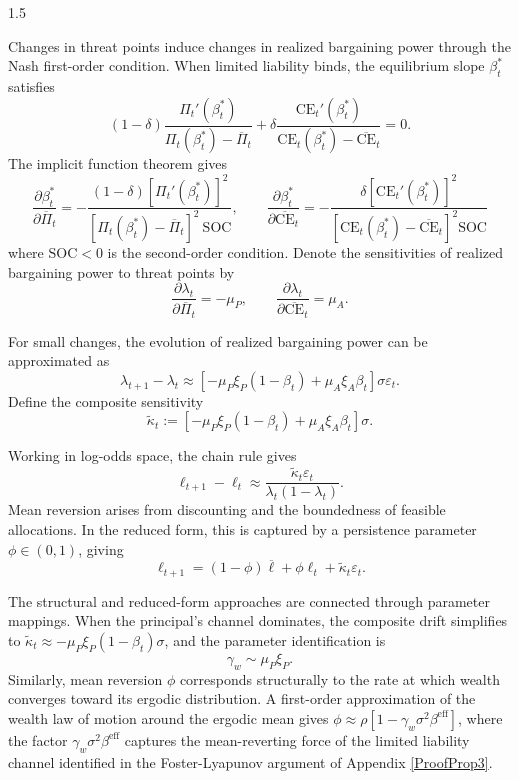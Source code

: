 \documentclass[12pt]{article}
\theoremstyle{definition}
\theoremstyle{plain}
\begin{document}
\begin{spacing}{1.5}
\begin{appendices}
    Changes in threat points induce changes in realized bargaining power through the Nash first-order condition. When limited liability binds, the equilibrium slope $\beta_t^*$ satisfies
    \[
    (1-\delta) \frac{\Pi_t'(\beta_t^*)}{\Pi_t(\beta_t^*) - \overline{\Pi}_t} + \delta \frac{\text{CE}_t'(\beta_t^*)}{\text{CE}_t(\beta_t^*) - \overline{\text{CE}}_t} = 0.
    \]
    The implicit function theorem gives
    \[
    \frac{\partial \beta_t^*}{\partial \overline{\Pi}_t} = -\frac{(1-\delta)[\Pi_t'(\beta_t^*)]^2}{[\Pi_t(\beta_t^*) - \overline{\Pi}_t]^2\ \text{SOC}}, \qquad \frac{\partial \beta_t^*}{\partial \overline{\text{CE}}_t} = -\frac{\delta[\text{CE}_t'(\beta_t^*)]^2}{[\text{CE}_t(\beta_t^*) - \overline{\text{CE}}_t]^2 \text{SOC}}
    \]
    where $\text{SOC} < 0$ is the second-order condition. Denote the sensitivities of realized bargaining power to threat points by
    \[
    \frac{\partial \lambda_t}{\partial \overline{\Pi}_t} = -\mu_P, \qquad \frac{\partial \lambda_t}{\partial \overline{\text{CE}}_t} = \mu_A.
    \]
    
    For small changes, the evolution of realized bargaining power can be approximated as
    \[
    \lambda_{t+1} - \lambda_t \approx [-\mu_P \xi_P (1-\beta_t) + \mu_A \xi_A \beta_t] \sigma \varepsilon_t.
    \]
    Define the composite sensitivity
    \[
    \tilde{\kappa}_t := [-\mu_P \xi_P (1-\beta_t) + \mu_A \xi_A \beta_t] \sigma.
    \]
    
    Working in log-odds space, the chain rule gives
    \[
    \ell_{t+1} - \ell_t \approx \frac{\tilde{\kappa}_t \varepsilon_t}{\lambda_t(1-\lambda_t)}.
    \]
    Mean reversion arises from discounting and the boundedness of feasible allocations. In the reduced form, this is captured by a persistence parameter $\phi \in (0,1)$, giving
    \[
    \ell_{t+1} = (1-\phi)\overline{\ell} + \phi \ell_t + \tilde{\kappa}_t \varepsilon_t.
    \]
    
    The structural and reduced-form approaches are connected through parameter mappings. When the principal's channel dominates, the composite drift simplifies to $\tilde{\kappa}_t \approx -\mu_P \xi_P (1-\beta_t) \sigma$, and the parameter identification is
    \[
    \gamma_w \sim \mu_P \xi_P.
    \]
    Similarly, mean reversion $\phi$ corresponds structurally to the rate at which wealth converges toward its ergodic distribution. A first-order approximation of the wealth law of motion around the ergodic mean gives $\phi \approx \rho[1 - \gamma_w \sigma^2 \beta^{\mathrm{eff}}]$, where the factor $\gamma_w\sigma^2\beta^{\mathrm{eff}}$ captures the mean-reverting force of the limited liability channel identified in the Foster-Lyapunov argument of Appendix \ref{ProofProp3}.


\end{appendices}
\end{spacing}
\end{document}
